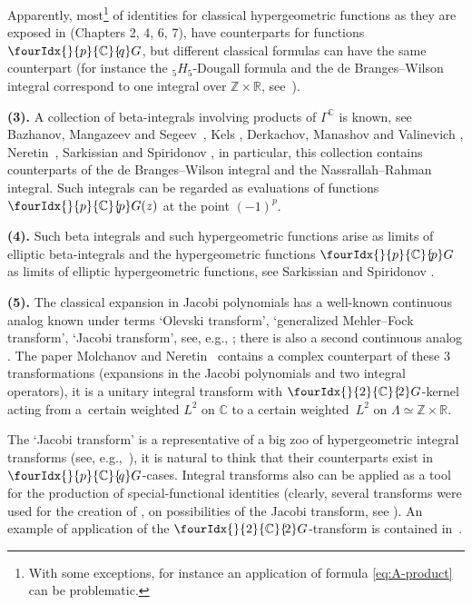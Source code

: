 \documentclass[pdftex]{sigma}
\numberwithin{equation}{section}
\newcommand{\Gc}[2]{\fourIdx{}{#1}{\C}{\!#2}G}
\def\R {{\mathbb R }}
\def\C {{\mathbb C }}
\def\Z{{\mathbb Z}}
\begin{document}
Apparently, most\footnote{With some exceptions, for instance an application
of formula \eqref{eq:A-product} can be problematic.}
of identities for classical hypergeometric functions as
they are exposed in \cite{HTF1,HTF2} (Chapters 2, 4, 6, 7),
\cite{AAR, Sla} have counterparts for functions $\Gc{p}{q}$, but
different classical formulas can have the same counterpart
(for instance the ${_5H_5}$-Dougall formula and the de Branges--Wilson
integral correspond to one integral over $\Z\times \R$, see~\cite{Ner-doug}).

\textbf{(3).}
A collection of beta-integrals involving products
of $\Gamma^\C$ is known, see Bazhanov, Man\-ga\-zeev and Segeev~\cite{BMS},
Kels \cite{Kel1,Kel2}, Derkachov, Manashov and Valinevich
\cite{DM1,DM2,DMV1,DMV2},
Nere\-tin~\cite{Ner-doug}, Sarkissian and Spiridonov \cite{SS},
in particular, this collection contains counterparts of the
de Branges--Wilson integral and the Nassrallah--Rahman integral.
Such integrals can be regarded as evaluations
of functions $\Gc{p}{p}(z)$ at the point $(-1)^p$.

\textbf{(4).}
Such beta integrals and such hypergeometric functions
arise as limits of elliptic beta-integrals and the hypergeometric
functions $\Gc{p}{p}$ as limits of elliptic hypergeometric functions,
see Sarkissian and Spiridonov \cite{SS}.

\textbf{(5).}
The classical expansion in Jacobi polynomials has
a well-known continuous analog known under terms
`Olevski transform', `generalized Mehler--Fock transform',
`Jacobi transform', see, e.g., \cite{Koo};
there is also a second continuous analog \cite{Ner-Jacobi}.
The paper Molchanov and Neretin~\cite{MN} contains a
complex counterpart of these $3$ transformations
(expansions in the Jacobi polynomials
and two integral operators), it is a unitary integral transform
with $\Gc{2}{2}$-kernel
acting from a~certain weighted $L^2$ on $\C$ to a certain weighted~$L^2$ on $\Lambda\simeq\Z\times \R$.

The `Jacobi transform' is a representative of a big zoo of
hypergeometric integral transforms (see, e.g.,~\cite{Yak}),
it is natural to think that their counterparts
exist in $\Gc{p}{q}$-cases.
Integral transforms also can be applied as a tool for the production
of special-functional identities (clearly, several transforms were used
for the creation of \cite[Vol.~3]{PBM}, on possibilities
of the Jacobi transform, see \cite{Ner-w}).
An example of application of the $\Gc{2}{2}$-transform
is contained in~\cite{Ner-doug}.
\end{document}
